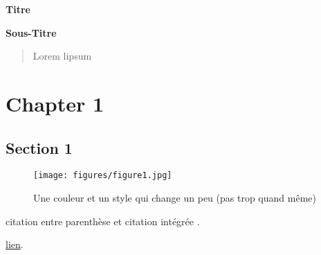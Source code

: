 \documentclass{config}
\begin{document}
\thispagestyle{empty}

\vspace*{15cm}

{\noindent\hspace*{1cm} \sffamily\bfseries\color{DarkCyan}\huge Titre}\\

\vspace*{0cm}

{\noindent\hspace*{1cm} \sffamily\bfseries\color{Cyan}\Large Sous-Titre}

\newpage
{}


\begin{abstract}
  Lorem lipsum
\end{abstract}


\newpage 
{\hypersetup{linkcolor=LightCyan}\tableofcontents}
\newpage


\chapter{Chapter 1}
\section{Section 1}
\begin{wrapfigure}{r}{0.4\textwidth}
  \centering
  \vspace{-4mm}
  \texttt{[image: figures/figure1.jpg]}
  \vspace{-1mm}
  \captionsetup{width=0.37\textwidth}
  \caption{Une couleur et un style qui change un peu (pas trop quand même)}
  \label{fig:figure1}
  \vspace{-15mm}
\end{wrapfigure}
\lipsum[1][1-4] citation entre parenthèse \citep{foote1856circumstances, doyle1992adventures} et citation intégrée \citet{template}.\par
\lipsum[1][5] \href{https://makaho.sk8.inrae.fr/}{lien}.
\end{document}
